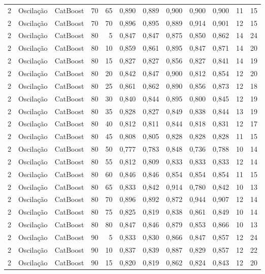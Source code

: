 \begin{longtable}{@{}rllrrrrrrrrr@{}}
2 & Oscilação & CatBoost & 70 & 65 & 0,890 & 0,889 & 0,900 & 0,900 & 0,900 & 11 & 15 \\
2 & Oscilação & CatBoost & 70 & 70 & 0,896 & 0,895 & 0,889 & 0,914 & 0,901 & 12 & 15 \\
2 & Oscilação & CatBoost & 80 & 5 & 0,847 & 0,847 & 0,875 & 0,850 & 0,862 & 14 & 24 \\
2 & Oscilação & CatBoost & 80 & 10 & 0,859 & 0,861 & 0,895 & 0,847 & 0,871 & 14 & 20 \\
2 & Oscilação & CatBoost & 80 & 15 & 0,827 & 0,827 & 0,856 & 0,827 & 0,841 & 14 & 19 \\
2 & Oscilação & CatBoost & 80 & 20 & 0,842 & 0,847 & 0,900 & 0,812 & 0,854 & 12 & 20 \\
2 & Oscilação & CatBoost & 80 & 25 & 0,861 & 0,862 & 0,890 & 0,856 & 0,873 & 12 & 18 \\
2 & Oscilação & CatBoost & 80 & 30 & 0,840 & 0,844 & 0,895 & 0,800 & 0,845 & 12 & 19 \\
2 & Oscilação & CatBoost & 80 & 35 & 0,828 & 0,827 & 0,849 & 0,838 & 0,844 & 13 & 19 \\
2 & Oscilação & CatBoost & 80 & 40 & 0,812 & 0,811 & 0,844 & 0,818 & 0,831 & 12 & 17 \\
2 & Oscilação & CatBoost & 80 & 45 & 0,808 & 0,805 & 0,828 & 0,828 & 0,828 & 11 & 15 \\
2 & Oscilação & CatBoost & 80 & 50 & 0,777 & 0,783 & 0,848 & 0,736 & 0,788 & 10 & 14 \\
2 & Oscilação & CatBoost & 80 & 55 & 0,812 & 0,809 & 0,833 & 0,833 & 0,833 & 12 & 14 \\
2 & Oscilação & CatBoost & 80 & 60 & 0,846 & 0,846 & 0,854 & 0,854 & 0,854 & 11 & 15 \\
2 & Oscilação & CatBoost & 80 & 65 & 0,833 & 0,842 & 0,914 & 0,780 & 0,842 & 10 & 13 \\
2 & Oscilação & CatBoost & 80 & 70 & 0,896 & 0,892 & 0,872 & 0,944 & 0,907 & 12 & 14 \\
2 & Oscilação & CatBoost & 80 & 75 & 0,825 & 0,819 & 0,838 & 0,861 & 0,849 & 10 & 14 \\
2 & Oscilação & CatBoost & 80 & 80 & 0,847 & 0,846 & 0,879 & 0,853 & 0,866 & 10 & 13 \\
2 & Oscilação & CatBoost & 90 & 5 & 0,833 & 0,830 & 0,866 & 0,847 & 0,857 & 12 & 24 \\
2 & Oscilação & CatBoost & 90 & 10 & 0,837 & 0,839 & 0,887 & 0,829 & 0,857 & 12 & 22 \\
2 & Oscilação & CatBoost & 90 & 15 & 0,820 & 0,819 & 0,862 & 0,824 & 0,843 & 12 & 20 \\

\end{longtable}
